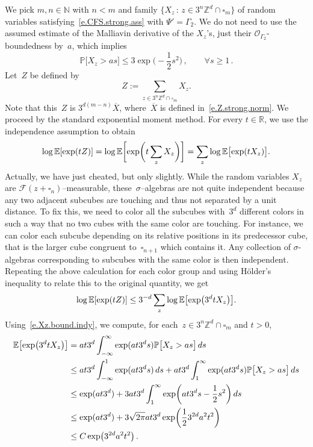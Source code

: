 \documentclass[11pt]{article} %
\let\oldsquare\square %
\renewcommand{\square}{\oldsquare}
\numberwithin{equation}{section}
\theoremstyle{definition}
\let\originalleft\left
\let\originalright\right
\renewcommand{\left}{\mathopen{}\mathclose\bgroup\originalleft}
\renewcommand{\right}{\aftergroup\egroup\originalright}
\newcommand*{\N}{\ensuremath{\mathbb{N}}}
\newcommand*{\R}{\ensuremath{\mathbb{R}}}
\newcommand*{\Zd}{\ensuremath{\mathbb{Z}^d}}
\newcommand{\cu}{\square}
\newcommand{\F}{\mathcal{F}}
\renewcommand{\P}{\mathbb{P}}
\newcommand{\E}{\mathbb{E}}
\renewcommand{\O}{\mathcal{O}}
\begin{document}
We pick $m,n\in\N$ with $n<m$ and family $\{ X_z \,:\, z\in 3^n\Zd\cap \cu_m\}$ of random variables satisfying~\eqref{e.CFS.strong.ass} with $\Psi'=\Gamma_2$. We do not need to use the assumed estimate of the Malliavin derivative of the $X_z$'s, just their $\O_{\Gamma_2}$-boundedness by~$a$, which implies
\begin{equation}
\label{e.Xz.bound.indy}
\P \bigl[ X_z > as \bigr] \leq 3 \exp\biggl( - \frac12 s^2 \biggr)\,, \qquad \forall s\geq 1\,.
\end{equation}
Let~$Z$ be defined by 
\begin{equation}
\label{e.Z}
Z:= \sum_{z\in 3^n\Zd \cap\cu_m} 
X_z. 
\end{equation}
Note that this~$Z$ is $3^{d(m-n)} \overline{X}$, where~$\overline{X}$ is defined in~\eqref{e.Z.strong.norm}. 
We proceed by the standard exponential moment method. 
For every $t\in\R$, we use the independence assumption to obtain
\begin{equation*}
\log \E \left[ \exp\left( t Z\right) \right]
= 
\log \E \biggl[ \exp\biggl( t\sum_{z} X_z \biggr) \biggr]
= 
\sum_{z} \log \E \bigl[ \exp ( t X_z ) \bigr].
\end{equation*}
Actually, we have just cheated, but only slightly. While the random variables $X_z$ are $\F(z+\cu_n)$--measurable, these~$\sigma$--algebras are not quite independent because any two adjacent subcubes are touching and thus not separated by a unit distance. To fix this, we need to color all the subcubes with~$3^d$ different colors in such a way that no two cubes with the same color are touching. For instance, we can color each subcube depending on its relative positions in its predecessor cube, that is the larger cube congruent to~$\cu_{n+1}$ which contains it.  Any collection of $\sigma$-algebras corresponding to subcubes with the same color is then independent. Repeating the above calculation for each color group and using H\"older's inequality to relate this to the original quantity, we get
\begin{equation}
\label{e.indy.expmom}
\log \E \left[ \exp\left( t  Z\right) \right]
\leq 
3^{-d} \sum_{z} \log \E \left[ \exp \left( 3^dt  X_z  \right) \right].
\end{equation}
Using~\eqref{e.Xz.bound.indy}, we compute, for each~$z\in 3^n\Zd\cap \cu_m$ and $t>0$, 
\begin{align*}
\E \left[ \exp \left( 3^dt  X_z  \right) \right]
& 
=
at3^d 
\int_{-\infty}^\infty 
\exp(at 3^d s) \P \bigl[ X_z > a s \bigr] \,ds
\\ & 
\leq
at3^d 
\int_{-\infty}^1 
\exp(at 3^d s) \,ds
+
at3^d 
\int_{1}^\infty 
\exp(at 3^d s) \P \bigl[ X_z > a s \bigr] \,ds
\\
&
\leq 
\exp( at3^d) 
+
3at3^d 
\int_{1}^\infty 
\exp\biggl(at 3^d s -\frac12s^2 \biggr) \,ds
\\ & 
\leq
\exp( at3^d) 
+
3\sqrt{2\pi} 
at3^d \exp\biggl( \frac123^{2d} a^2 t^2 \biggr)
\\ & 
\leq 
C \exp\bigl( 3^{2d} a^2 t^2 \bigr)
\,.
\end{align*}
\end{document}
